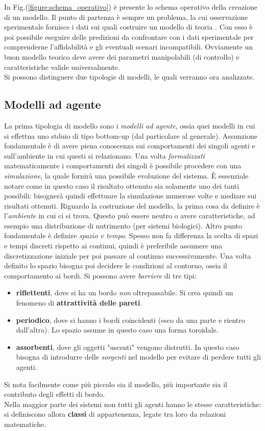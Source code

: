 \documentclass[12pt, a4paper]{book}
\theoremstyle{theorem}
\begin{document}
			In Fig.(\ref{figure:schema_operativo}) è presente lo schema operativo della creazione di un modello.
			Il punto di partenza è sempre un problema, la cui osservazione sperimentale fornisce i dati sui quali costruire un modello di teoria .
			Con esso è poi possibile eseguire delle predizioni da confrontare con i dati sperimentale per comprenderne l'affidabilità e gli eventuali scenari incompatibili.
			Ovviamente un buon modello teorico deve avere dei parametri manipolabili (di controllo) e caratteristiche valide universalmente.
			\\
			Si possono distinguere due tipologie di modelli, le quali verranno ora analizzate.
			\subsection{Modelli ad agente}
				La prima tipologia di modello sono i \emph{modelli ad agente}, ossia quei modelli in cui si effettua uno stduio di tipo bottom-up (dal particolare al generale).
				Assunzione fondamentale è di avere piena conoscenza sui comportamenti dei singoli agenti e sull'ambiente in cui questi si relazionano.
				Una volta \emph{formalizzati} matematicamente i comportamenti dei singoli è possibile procedere con una \emph{simulazione}, la quale fornirà una possibile evoluzione del sistema.
				È essenziale notare come in questo caso il risultato ottenuto sia solamente uno dei tanti possibili: bisognerà quindi effettuare la simulazione numerose volte e mediare sui risultati ottenuti.
				Riguardo la costruzione del modello, la prima cosa da definire è l'\textit{ambiente} in cui ci si trova. 
				Questo può essere neutro o avere caratteristiche, ad esempio una distribuzione di nutrimento (per sistemi biologici).
				Altro punto fondamentale è definire \textit{spazio e tempo}. 
				Spesso non fa differenza la scelta di spazi e tempi discreti rispetto ai continui, quindi è preferibile assumere una discretizzazione iniziale per poi passare al continuo successivamente.
				Una volta definito lo spazio bisogna poi decidere le condizioni al contorno, ossia il comportamento ai bordi. 
				Si possono avere \textit{barriere} di tre tipi:
				\begin{itemize}
					\item \textbf{riflettenti}, dove si ha un bordo \textit{non} oltrepassabile. Si crea quindi un fenomeno di \textbf{attrattività delle pareti}.
					\item \textbf{periodico}, dove si hanno i bordi coincidenti (esco da una parte e rientro dall'altra). Lo spazio assume in questo caso una forma toroidale.
					\item \textbf{assorbenti}, dove gli oggetti "uscenti" vengono distrutti. In questo caso bisogna di introdurre delle \textit{sorgenti} nel modello per evitare di perdere tutti gli agenti.
				\end{itemize}
				Si nota facilmente come più piccolo sia il modello, più importante sia il contributo degli effetti di bordo.\\
				Nella maggior parte dei sistemi non tutti gli agenti hanno le stesse caratteristiche: si definiscono allora \textbf{classi} di appartenenza, legate tra loro da relazioni matematiche.
\end{document}

